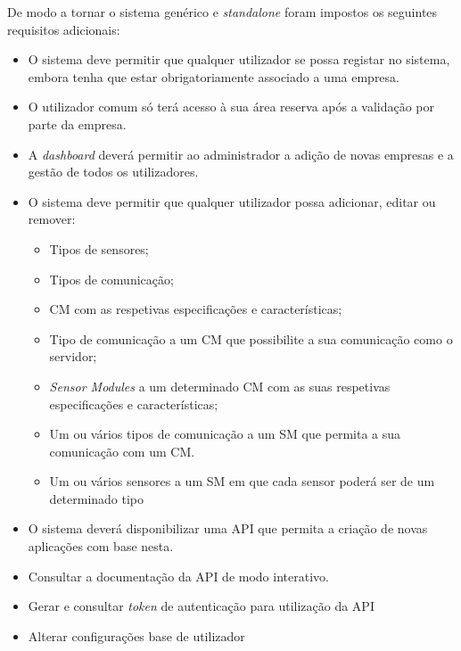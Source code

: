 De modo a tornar o sistema genérico e \textit{standalone} foram impostos os seguintes requisitos adicionais: 


\begin{itemize}
	\item O sistema deve permitir que qualquer utilizador se possa registar no sistema, embora tenha que estar obrigatoriamente associado a uma empresa.
	
	\item O utilizador comum só terá acesso à sua área reserva após a validação por parte da empresa.
	
	\item A \textit{dashboard} deverá permitir ao administrador a adição de novas empresas e a gestão de todos os utilizadores. 
	
	
	\item O sistema deve permitir que qualquer utilizador possa adicionar, editar ou remover: 
	\begin{itemize}
		\item Tipos de sensores; 
		
		\item Tipos de comunicação;
		
		\item \acl{CM} com as respetivas especificações e características;
		
		\item Tipo de comunicação a um \acl{CM} que possibilite a sua comunicação como o servidor; 
		
		\item  \textit{Sensor Modules} a um determinado \acl{CM} com as suas respetivas especificações e características; 
		
		\item Um ou vários tipos de comunicação a um \acl{SM} que permita a sua comunicação com um \acl{CM}. 
		
		
		\item Um ou vários sensores a um \acl{SM} em que cada sensor poderá ser de um determinado tipo
	\end{itemize}
	
		
	\item O sistema deverá disponibilizar uma \ac{API} que permita a criação de novas aplicações com base nesta. 
	
	\item Consultar a documentação da \ac{API} de modo interativo. 
	
	\item Gerar e consultar  \textit{token} de autenticação para utilização da \ac{API} 
	
	\item Alterar configurações base de utilizador 
	
\end{itemize}
	


